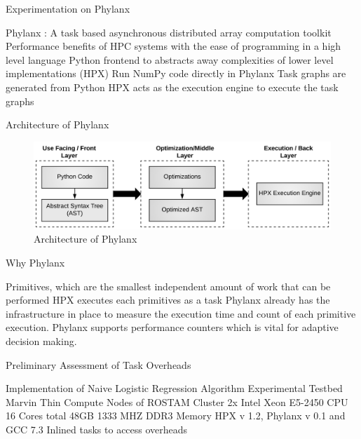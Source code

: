 \documentclass[10pt]{beamer}
\begin{document}
\begin{frame}{Experimentation on Phylanx}
\begin{outline}
	\1 Phylanx : A task based asynchronous distributed array computation toolkit 
	\1 Performance benefits of HPC systems with the ease of programming in a high level language
	\1 Python frontend to abstracts away complexities of lower level implementations (HPX)
	\1 Run NumPy code directly in Phylanx
	\1 Task graphs are generated from Python
	\1 HPX acts as the execution engine to execute the task graphs
\end{outline}
\end{frame}

\begin{frame}{Architecture of Phylanx}
\begin{figure}[!h]
	\centering
	\includegraphics[width=1\linewidth]{figures/phylanx_arch.pdf}
	\caption{Architecture of Phylanx }
\end{figure}
\end{frame}

\begin{frame}{Why Phylanx}
\begin{outline}
	\1 Primitives, which are the smallest independent amount of work that can be performed
	\1 HPX executes each primitives as a task
	\1 Phylanx already has the infrastructure in place to measure the execution time and count of each primitive execution.
	\1 Phylanx supports performance counters which is vital for adaptive decision making.
\end{outline}
\end{frame}

\begin{frame}{Preliminary Assessment of Task Overheads}
\begin{outline}
	\1 Implementation of Naive Logistic Regression Algorithm 
	\1 Experimental Testbed 
		\2 Marvin Thin Compute Nodes of ROSTAM Cluster 
		\2 2x Intel Xeon E5-2450 CPU 16 Cores total 
		\2 48GB 1333 MHZ DDR3 Memory 
		\2 HPX v 1.2, Phylanx v 0.1 and  GCC 7.3 
	\1 Inlined tasks to access overheads
\end{outline}
\end{frame}
\end{document}
